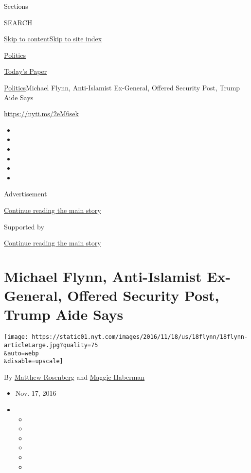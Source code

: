 Sections

SEARCH

\protect\hyperlink{site-content}{Skip to
content}\protect\hyperlink{site-index}{Skip to site index}

\href{https://www.nytimes.com/section/politics}{Politics}

\href{https://myaccount.nytimes.com/auth/login?response_type=cookie\&client_id=vi}{}

\href{https://www.nytimes.com/section/todayspaper}{Today's Paper}

\href{/section/politics}{Politics}\textbar{}Michael Flynn, Anti-Islamist
Ex-General, Offered Security Post, Trump Aide Says

\url{https://nyti.ms/2eM6sek}

\begin{itemize}
\item
\item
\item
\item
\item
\item
\end{itemize}

Advertisement

\protect\hyperlink{after-top}{Continue reading the main story}

Supported by

\protect\hyperlink{after-sponsor}{Continue reading the main story}

\hypertarget{michael-flynn-anti-islamist-ex-general-offered-security-post-trump-aide-says}{%
\section{Michael Flynn, Anti-Islamist Ex-General, Offered Security Post,
Trump Aide
Says}\label{michael-flynn-anti-islamist-ex-general-offered-security-post-trump-aide-says}}

\texttt{[image: https://static01.nyt.com/images/2016/11/18/us/18flynn/18flynn-articleLarge.jpg?quality=75\\\&auto=webp\\\&disable=upscale]}

By \href{http://www.nytimes.com/by/matthew-rosenberg}{Matthew Rosenberg}
and \href{http://www.nytimes.com/by/maggie-haberman}{Maggie Haberman}

\begin{itemize}
\item
  Nov. 17, 2016
\item
  \begin{itemize}
  \item
  \item
  \item
  \item
  \item
  \item
  \end{itemize}
\end{itemize}

